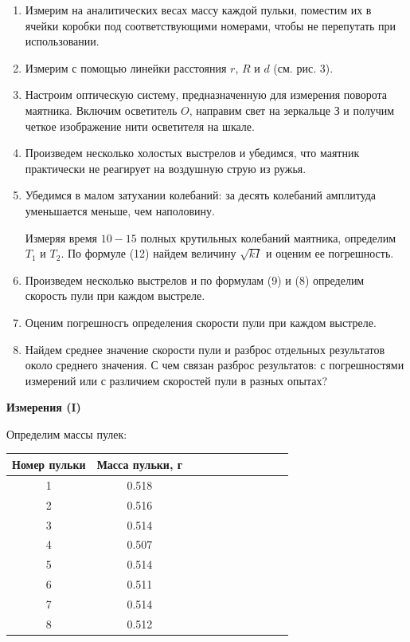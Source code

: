 \documentclass[14pt]{article}
\begin{document}
\begin{flushleft}
\begin{enumerate}
\item  Измерим на аналитических весах массу каждой пульки, поместим их в ячейки коробки под соответствующими номерами, чтобы не перепутать при использовании. 

\item  Измерим с помощью линейки расстояния $r$, $R$ и $d$ (см. рис. 3).

\item Настроим оптическую систему, предназначенную для измерения поворота маятника. Включим осветитель $O$, направим свет на зеркальце 
$\text{З}$ и получим четкое изображение нити осветителя на шкале.

\item Произведем  несколько холостых выстрелов и убедимся, что маятник практически не реагирует на воздушную струю из ружья.

\item Убедимся в малом затухании колебаний: за десять колебаний амплитуда уменьшается меньше, чем наполовину.

Измеряя время $10-15$ полных крутильных колебаний маятника, определим $T_1$ и $T_2$. По формуле (12) найдем величину $\sqrt{kI}$ и оценим ее погрешность.

\item Произведем несколько выстрелов и по формулам (9) и (8) определим скорость пули при каждом выстреле.

\item Оценим погрешносгь определения скорости пули при каждом выстреле.

\item Найдем среднее значение скорости пули и разброс отдельных результатов около среднего значения. С чем связан разброс результатов: с погрешностями измерений или с различием скоростей пули в разных  опытах?
\end{enumerate}
\end{flushleft}

\newpage
\textbf{Измерения (I)}

Определим массы пулек:

\begin{center}
\begin{tabular}{|c|c|c|c|c|c|c|c|c|c|c|}
\hline
Номер пульки	&	Масса пульки, г			\\
\hline
1				&	0.518					\\
\hline
2				&	0.516					\\
\hline
3				&	0.514					\\
\hline
4				&	0.507					\\
\hline
5				&	0.514					\\
\hline
6				&	0.511					\\
\hline
7				&	0.514					\\
\hline
8				&	0.512					\\
\hline
\end{tabular}
\end{center}
\end{document}

